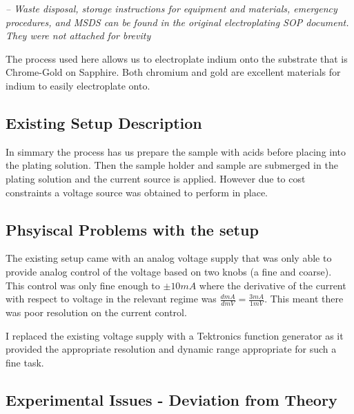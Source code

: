 \begin{center}
\begin{framed}
\begin{minipage}{0.8\textwidth}
        \vspace{0.5cm} %

        \textit{-- Waste disposal, storage instructions for equipment and materials, emergency procedures, and MSDS can be found in the original electroplating SOP document. They were not attached for brevity }

        \end{minipage}
    \end{framed}
\end{center}

The process used here allows us to electroplate indium onto the substrate that is Chrome-Gold on Sapphire. Both chromium and gold are excellent materials for indium to easily electroplate onto.

\subsection{Existing Setup Description}

In simmary the process has us prepare the sample with acids before placing into the plating solution. Then the sample holder and sample are submerged in the plating solution and the current source is applied. However due to cost constraints a voltage source was obtained to perform in place.


\subsection{Phsyiscal Problems with the setup}


The existing setup came with an analog voltage supply that was only able to provide analog control of the voltage based on two knobs (a fine and coarse). This control was only fine enough to $\pm10mA$ where the derivative of the current with respect to voltage in the relevant regime was $\frac{d mA}{d mV} = \frac{3 mA}{1 mV}$. This meant there was poor resolution on the current control.

I replaced the existing voltage supply with a Tektronics function generator as it provided the appropriate resolution and dynamic range appropriate for such a fine task.

\subsection{Experimental Issues - Deviation from Theory}


